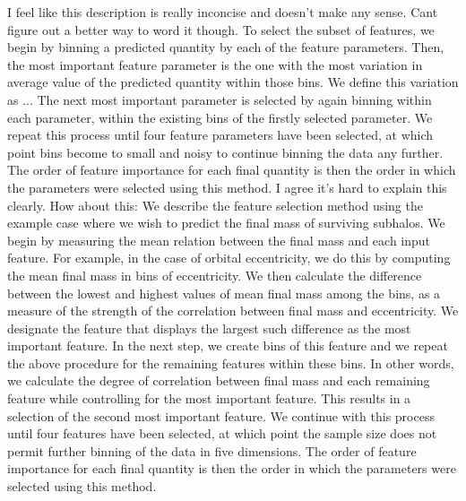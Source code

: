 \documentclass[fleqn,usenatbib]{mnras}
\newcommand\edits[1]{{\color{red}#1}}
\newcommand\aab[1]{{\color{green}#1}}
\begin{document}
\edits{I feel like this description is really inconcise and doesn't make any sense. Cant figure out a better way to word it though.} To select the subset of features, we begin by binning a predicted quantity by each of the feature parameters. Then, the most important feature parameter is the one with the most variation in average value of the predicted quantity within those bins. We define this variation as ... The next most important parameter is selected by again binning within each parameter, within the existing bins of the firstly selected parameter. We repeat this process until four feature parameters have been selected, at which point bins become to small and noisy to continue binning the data any further. The order of feature importance for each final quantity is then the order in which the parameters were selected using this method.
\aab{I agree it's hard to explain this clearly. How about this: We describe the feature selection method using the example case where we wish to predict the final mass of surviving subhalos. We begin by measuring the mean relation between the final mass and each input feature. For example, in the case of orbital eccentricity, we do this by computing the mean final mass in bins of eccentricity. We then calculate the difference between the lowest and highest values of mean final mass among the bins, as a measure of the strength of the correlation between final mass and eccentricity. We designate the feature that displays the largest such difference as the most important feature. In the next step, we create bins of this feature and we repeat the above procedure for the remaining features within these bins. In other words, we calculate the degree of correlation between final mass and each remaining feature while controlling for the most important feature. This results in a selection of the second most important feature. We continue with this process until four features have been selected, at which point the sample size does not permit further binning of the data in five dimensions. The order of feature importance for each final quantity is then the order in which the parameters were selected using this method.
}
\end{document}
